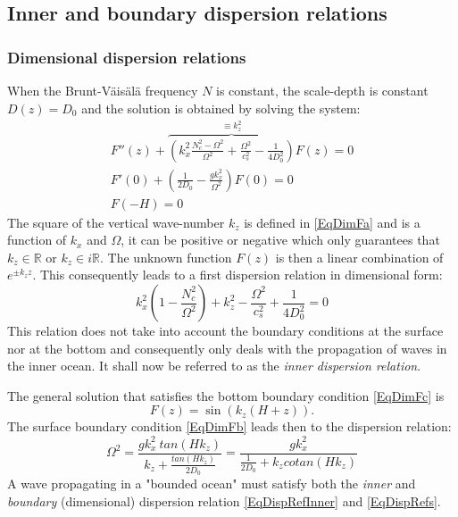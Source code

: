 \documentclass[a4paper,11pt]{article}
\begin{document}
\subsection{Inner and boundary dispersion relations}
 \label{SubSectionDisp}
 
 \subsubsection{Dimensional dispersion relations}
When the Brunt-V\"ais\"al\"a frequency $N$ is constant, the scale-depth is constant $D(z)=D_0$ and the solution is obtained by solving the system:
\begin{subequations}
	\label{EqDimF}
	\begin{alignat}{2}	
    \displaystyle
	\label{EqDimFa}
    F''(z)
    +
   \overbrace{ \left(k_x^2\frac{N_c^2-\Omega^2}{\Omega^2}+\frac{\Omega^2}{c_s^2}-\frac{1}{4D_0^2}\right)}^{\equiv k_z^2}
    F(z)=0\\[4mm]
	\label{EqDimFb}
    \displaystyle
    F'(0)+\left(
    \frac{1}{2D_0}-\frac{gk_x^2}{\Omega^2}
    \right)F(0)=0\\[4mm]
	\label{EqDimFc}
    \displaystyle
    F(-H)=0
  \end{alignat}
\end{subequations}
The square of the vertical wave-number $k_z$ is defined in \ref{EqDimFa} and is a function of $k_x$ and $\Omega$, it can be positive or negative which only guarantees that $k_z \in \mathbb{R}$ or $k_z \in i\mathbb{R}$. The unknown function $F(z)$ is then a linear combination of $e^{\pm k_z z}$. This consequently leads to a first dispersion relation in dimensional form:
\begin{equation}
  \label{EqDispRefInner}
  \displaystyle
   k_x^2\left(1-\frac{N_c^2}{\Omega^2}\right)+k_z^2
   -\frac{\Omega^2}{c_s^2}+\frac{1}{4D_0^2}=0
\end{equation}
This relation does not take into account the boundary conditions at the surface nor at the bottom and consequently only deals with the propagation of waves in the inner ocean. It shall now be referred to as the \textit{inner dispersion relation}.

The general solution that satisfies the bottom boundary condition \ref{EqDimFc} is
\begin{equation}
	\label{EqDispRef}
  	\displaystyle
  	F(z)=\sin\left(k_z(H+z)\right).
\end{equation}
The surface boundary condition \ref{EqDimFb} leads then to the dispersion relation:
\begin{equation}
	\label{EqDispRefs}
     \Omega^2 =\frac{gk_x^2\ tan(Hk_z)}{k_z +\frac{ tan(Hk_z)}{2 D_0 }}
    =\frac{gk_x^2 }{\frac{1}{ 2 D_0} + k_z cotan(Hk_z)}
\end{equation}
A wave propagating in a "bounded ocean" must satisfy both the \textit{inner} and \textit{boundary} (dimensional) dispersion relation \ref{EqDispRefInner} and \ref{EqDispRefs}.
\end{document}
